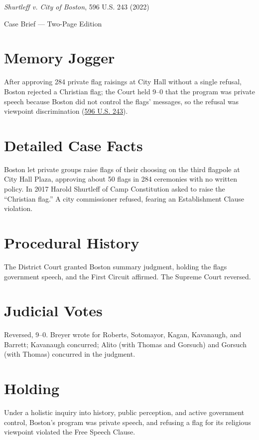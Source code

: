 \documentclass[12pt]{article}
\begin{document}
\begin{center}
{\LARGE \textit{Shurtleff v. City of Boston}, 596 U.S. 243 (2022)\par}
\vspace{0.5em}
{\large Case Brief --- Two-Page Edition\par}
\end{center}

\section{Memory Jogger}
After approving 284 private flag raisings at City Hall without a single refusal, Boston rejected a Christian flag; the Court held 9--0 that the program was private speech because Boston did not control the flags' messages, so the refusal was viewpoint discrimination (\href{https://supreme.justia.com/cases/federal/us/596/20-1800/}{596 U.S. 243}).

\section{Detailed Case Facts}
Boston let private groups raise flags of their choosing on the third flagpole at City Hall Plaza, approving about 50 flags in 284 ceremonies with no written policy. In 2017 Harold Shurtleff of Camp Constitution asked to raise the ``Christian flag.'' A city commissioner refused, fearing an Establishment Clause violation.

\section{Procedural History}
The District Court granted Boston summary judgment, holding the flags government speech, and the First Circuit affirmed. The Supreme Court reversed.

\section{Judicial Votes}
Reversed, 9--0. Breyer wrote for Roberts, Sotomayor, Kagan, Kavanaugh, and Barrett; Kavanaugh concurred; Alito (with Thomas and Gorsuch) and Gorsuch (with Thomas) concurred in the judgment.

\section{Holding}
Under a holistic inquiry into history, public perception, and active government control, Boston's program was private speech, and refusing a flag for its religious viewpoint violated the Free Speech Clause.
\end{document}
